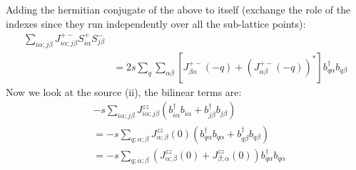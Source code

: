 Adding the hermitian conjugate of the above to itself (exchange the role of the indexes since they run independently over all the sub-lattice points):
\begin{equation}
\begin{split}
\sum_{i\alpha;j\beta}^{}J^{+-}_{i\alpha;j\beta}S^+_{i\alpha}S^-_{j\beta}&\\
&=2s\sum_{q}^{}\sum_{\alpha \beta}^{}[J^{+-}_{\beta \alpha}(-q) + (J^{+-}_{\alpha \beta}(-q))^*]b_{q\alpha}^\dagger b_{q\beta}
\end{split}
\end{equation}
Now we look at the source (ii), the bilinear terms are:
\begin{equation}
\begin{split}
&-s\sum_{i\alpha;j\beta}^{}J^{zz}_{i\alpha;j\beta}(b^\dagger_{i\alpha}b_{i\alpha} + b^\dagger_{j\beta}b_{j\beta})\\
&=-s\sum_{q;\alpha;\beta}^{}J^{zz}_{\alpha;\beta}(0)(b^\dagger_{q\alpha}b_{q\alpha} + b^\dagger_{q\beta}b_{q\beta})\\
&=-s\sum_{q;\alpha;\beta}^{}(J^{zz}_{\alpha;\beta}(0) + J^{zz}_{\beta;\alpha}(0))b^\dagger_{q\alpha}b_{q\alpha}
\end{split}
\end{equation}

